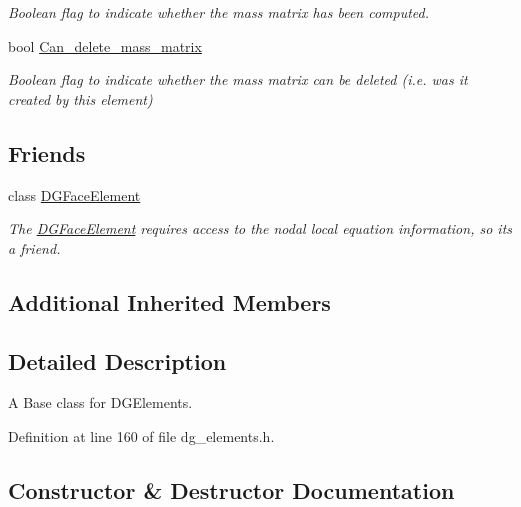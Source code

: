 \begin{DoxyCompactItemize}
\begin{DoxyCompactList}\small\item\em Boolean flag to indicate whether the mass matrix has been computed. \end{DoxyCompactList}\item 
bool \hyperlink{classoomph_1_1DGElement_a13357b2bf3bc7703050c6909d0ece927}{Can\+\_\+delete\+\_\+mass\+\_\+matrix}
\begin{DoxyCompactList}\small\item\em Boolean flag to indicate whether the mass matrix can be deleted (i.\+e. was it created by this element) \end{DoxyCompactList}\end{DoxyCompactItemize}
\subsection*{Friends}
\begin{DoxyCompactItemize}
\item 
class \hyperlink{classoomph_1_1DGElement_a0f4002a66e7e3bc5b0b40d9b201e596f}{D\+G\+Face\+Element}
\begin{DoxyCompactList}\small\item\em The \hyperlink{classoomph_1_1DGFaceElement}{D\+G\+Face\+Element} requires access to the nodal local equation information, so it\textquotesingle{}s a friend. \end{DoxyCompactList}\end{DoxyCompactItemize}
\subsection*{Additional Inherited Members}


\subsection{Detailed Description}
A Base class for D\+G\+Elements. 

Definition at line 160 of file dg\+\_\+elements.\+h.



\subsection{Constructor \& Destructor Documentation}
\mbox{\label{classoomph_1_1DGElement_a6dfe1d94811fd119007f8a8968876871}} 
